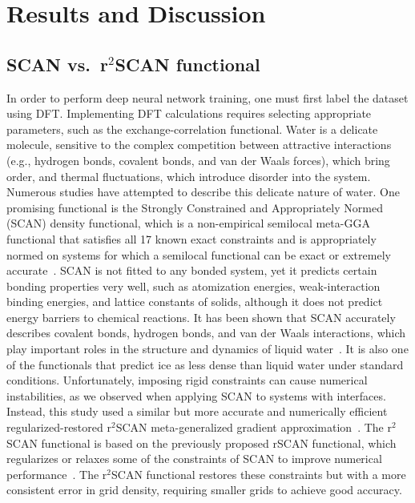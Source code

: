 \chapter{Results and Discussion}

\section{SCAN vs.\ r$^2$SCAN functional}
In order to perform deep neural network training, one must first label the dataset using DFT. Implementing DFT calculations requires selecting appropriate parameters, such as the exchange-correlation functional. Water is a delicate molecule, sensitive to the complex competition between attractive interactions (e.g., hydrogen bonds, covalent bonds, and van der Waals forces), which bring order, and thermal fluctuations, which introduce disorder into the system. Numerous studies have attempted to describe this delicate nature of water. One promising functional is the Strongly Constrained and Appropriately Normed (SCAN) density functional, which is a non-empirical semilocal meta-GGA functional that satisfies all 17 known exact constraints and is appropriately normed on systems for which a semilocal functional can be exact or extremely accurate~\cite{sun2015strongly}. SCAN is not fitted to any bonded system, yet it predicts certain bonding properties very well, such as atomization energies, weak-interaction binding energies, and lattice constants of solids, although it does not predict energy barriers to chemical reactions. It has been shown that SCAN accurately describes covalent bonds, hydrogen bonds, and van der Waals interactions, which play important roles in the structure and dynamics of liquid water~\cite{chen2017ab}. It is also one of the functionals that predict ice as less dense than liquid water under standard conditions. Unfortunately, imposing rigid constraints can cause numerical instabilities, as we observed when applying SCAN to systems with interfaces. Instead, this study used a similar but more accurate and numerically efficient regularized-restored r$^2$SCAN meta-generalized gradient approximation~\cite{Furness2020}. The r$^2$SCAN functional is based on the previously proposed rSCAN functional, which regularizes or relaxes some of the constraints of SCAN to improve numerical performance~\cite{bartok2019}. The r$^2$SCAN functional restores these constraints but with a more consistent error in grid density, requiring smaller grids to achieve good accuracy.

